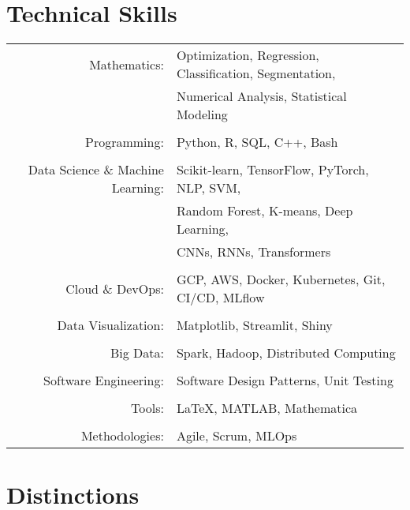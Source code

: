 \documentclass[a4paper,10pt]{article} %
\begin{document}
\vspace{1em}
\section{Technical Skills}

\begin{tabular}{r|l}
Mathematics: & Optimization, Regression, Classification, Segmentation,\\& Numerical Analysis, Statistical Modeling\\
\\
Programming: & Python, R, SQL, C++, Bash\\
\\
Data Science \& Machine Learning: & Scikit-learn, TensorFlow, PyTorch, NLP, SVM,\\& Random Forest, K-means, Deep Learning,\\& CNNs, RNNs, Transformers\\
\\
Cloud \& DevOps: & GCP, AWS, Docker, Kubernetes, Git, CI/CD, MLflow\\
\\
Data Visualization: & Matplotlib, Streamlit, Shiny\\
\\
Big Data: & Spark, Hadoop, Distributed Computing\\
\\
Software Engineering: & Software Design Patterns, Unit Testing\\
\\
Tools: & LaTeX, MATLAB, Mathematica\\
\\
Methodologies: & Agile, Scrum, MLOps\\
\end{tabular}


\section{Distinctions}
\end{document}
